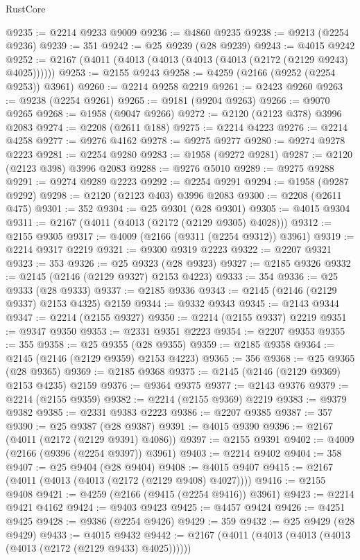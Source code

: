 \begin{lexlean}{RustCore}
\begin{coremodule}
@9235 := @2214 @9233 @9009
@9236 := @4860 @9235
@9238 := @9213 (@2254 @9236)
@9239 := 351
@9242 := @25 @9239 (@28 @9239)
@9243 := @4015 @9242
@9252 := @2167 (@4011 (@4013 (@4013 (@4013 (@4013 (@2172 (@2129 @9243) @4025))))))
@9253 := @2155 @9243
@9258 := @4259 (@2166 (@9252 (@2254 @9253)) @3961)
@9260 := @2214 @9258 @2219
@9261 := @2423 @9260
@9263 := @9238 (@2254 @9261)
@9265 := @9181 (@9204 @9263)
@9266 := @9070 @9265
@9268 := @1958 (@9047 @9266)
@9272 := @2120 (@2123 @378) @3996 @2083
@9274 := @2208 (@2611 @188)
@9275 := @2214 @4223
@9276 := @2214 @4258
@9277 := @9276 @4162
@9278 := @9275 @9277
@9280 := @9274 @9278 @2223
@9281 := @2254 @9280
@9283 := @1958 (@9272 @9281)
@9287 := @2120 (@2123 @398) @3996 @2083
@9288 := @9276 @5010
@9289 := @9275 @9288
@9291 := @9274 @9289 @2223
@9292 := @2254 @9291
@9294 := @1958 (@9287 @9292)
@9298 := @2120 (@2123 @403) @3996 @2083
@9300 := @2208 (@2611 @475)
@9301 := 352
@9304 := @25 @9301 (@28 @9301)
@9305 := @4015 @9304
@9311 := @2167 (@4011 (@4013 (@2172 (@2129 @9305) @4028)))
@9312 := @2155 @9305
@9317 := @4009 (@2166 (@9311 (@2254 @9312)) @3961)
@9319 := @2214 @9317 @2219
@9321 := @9300 @9319 @2223
@9322 := @2207 @9321
@9323 := 353
@9326 := @25 @9323 (@28 @9323)
@9327 := @2185 @9326
@9332 := @2145 (@2146 (@2129 @9327) @2153 @4223)
@9333 := 354
@9336 := @25 @9333 (@28 @9333)
@9337 := @2185 @9336
@9343 := @2145 (@2146 (@2129 @9337) @2153 @4325) @2159
@9344 := @9332 @9343
@9345 := @2143 @9344
@9347 := @2214 (@2155 @9327)
@9350 := @2214 (@2155 @9337) @2219
@9351 := @9347 @9350
@9353 := @2331 @9351 @2223
@9354 := @2207 @9353
@9355 := 355
@9358 := @25 @9355 (@28 @9355)
@9359 := @2185 @9358
@9364 := @2145 (@2146 (@2129 @9359) @2153 @4223)
@9365 := 356
@9368 := @25 @9365 (@28 @9365)
@9369 := @2185 @9368
@9375 := @2145 (@2146 (@2129 @9369) @2153 @4235) @2159
@9376 := @9364 @9375
@9377 := @2143 @9376
@9379 := @2214 (@2155 @9359)
@9382 := @2214 (@2155 @9369) @2219
@9383 := @9379 @9382
@9385 := @2331 @9383 @2223
@9386 := @2207 @9385
@9387 := 357
@9390 := @25 @9387 (@28 @9387)
@9391 := @4015 @9390
@9396 := @2167 (@4011 (@2172 (@2129 @9391) @4086))
@9397 := @2155 @9391
@9402 := @4009 (@2166 (@9396 (@2254 @9397)) @3961)
@9403 := @2214 @9402
@9404 := 358
@9407 := @25 @9404 (@28 @9404)
@9408 := @4015 @9407
@9415 := @2167 (@4011 (@4013 (@4013 (@2172 (@2129 @9408) @4027))))
@9416 := @2155 @9408
@9421 := @4259 (@2166 (@9415 (@2254 @9416)) @3961)
@9423 := @2214 @9421 @4162
@9424 := @9403 @9423
@9425 := @4457 @9424
@9426 := @4251 @9425
@9428 := @9386 (@2254 @9426)
@9429 := 359
@9432 := @25 @9429 (@28 @9429)
@9433 := @4015 @9432
@9442 := @2167 (@4011 (@4013 (@4013 (@4013 (@4013 (@2172 (@2129 @9433) @4025))))))

\end{coremodule}
\end{lexlean}
